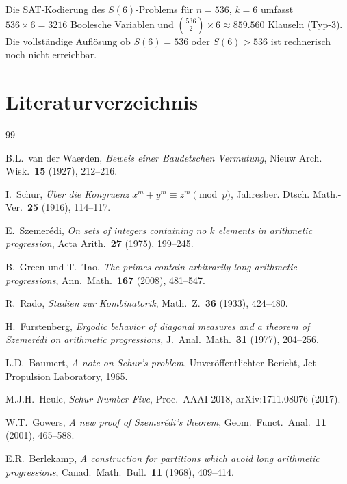 \documentclass[12pt,a4paper]{amsart}
\theoremstyle{definition}
\begin{document}
Die SAT-Kodierung des $S(6)$-Problems für $n = 536$, $k = 6$ umfasst
$536 \times 6 = 3216$ Boolesche Variablen und $\binom{536}{2} \times 6 \approx 859{.}560$
Klauseln (Typ-3). Die vollständige Auflösung ob $S(6) = 536$ oder $S(6) > 536$ ist
rechnerisch noch nicht erreichbar.

\section*{Literaturverzeichnis}

\begin{thebibliography}{99}

B.L.\ van der Waerden,
\emph{Beweis einer Baudetschen Vermutung},
Nieuw Arch. Wisk.\ \textbf{15} (1927), 212--216.

I.\ Schur,
\emph{\"{U}ber die Kongruenz $x^m + y^m \equiv z^m \pmod{p}$},
Jahresber. Dtsch. Math.-Ver.\ \textbf{25} (1916), 114--117.

E.\ Szemer\'edi,
\emph{On sets of integers containing no $k$ elements in arithmetic progression},
Acta Arith.\ \textbf{27} (1975), 199--245.

B.\ Green und T.\ Tao,
\emph{The primes contain arbitrarily long arithmetic progressions},
Ann.\ Math.\ \textbf{167} (2008), 481--547.

R.\ Rado,
\emph{Studien zur Kombinatorik},
Math.\ Z.\ \textbf{36} (1933), 424--480.

H.\ Furstenberg,
\emph{Ergodic behavior of diagonal measures and a theorem of Szemer\'edi on arithmetic progressions},
J.\ Anal.\ Math.\ \textbf{31} (1977), 204--256.

L.D.\ Baumert,
\emph{A note on Schur's problem},
Unveröffentlichter Bericht, Jet Propulsion Laboratory, 1965.

M.J.H.\ Heule,
\emph{Schur Number Five},
Proc.\ AAAI 2018, arXiv:1711.08076 (2017).

W.T.\ Gowers,
\emph{A new proof of Szemer\'edi's theorem},
Geom.\ Funct.\ Anal.\ \textbf{11} (2001), 465--588.

E.R.\ Berlekamp,
\emph{A construction for partitions which avoid long arithmetic progressions},
Canad.\ Math.\ Bull.\ \textbf{11} (1968), 409--414.


\end{thebibliography}
\end{document}

